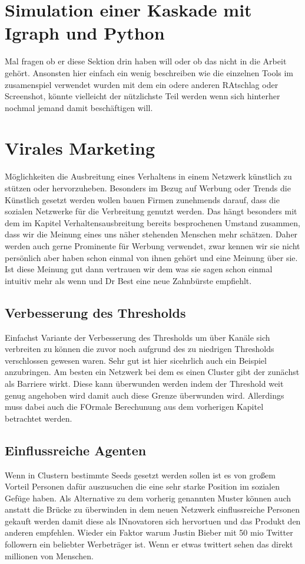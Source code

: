 \documentclass[12pt]{article}
\begin{document}
\section{Simulation einer Kaskade mit Igraph und Python}
Mal fragen ob er diese Sektion drin haben will oder ob das nicht in die Arbeit gehört. Ansonsten hier einfach ein wenig beschreiben wie die einzelnen Tools im zusamenspiel verwendet wurden mit dem ein odere anderen RAtschlag oder Screenshot, könnte vielleicht der nützlichste Teil werden wenn sich hinterher nochmal jemand damit beschäftigen will.

\section{Virales Marketing}
Möglichkeiten die Ausbreitung eines Verhaltens in einem Netzwerk künstlich zu stützen oder hervorzuheben. Besonders im Bezug auf Werbung oder Trends die Künstlich gesetzt werden wollen bauen Firmen zunehmends darauf, dass die sozialen Netzwerke für die Verbreitung genutzt werden. Das hängt besonders mit dem im Kapitel Verhaltensausbreitung bereits besprochenen Umstand zusammen, dass wir die Meinung eines uns näher stehenden Menschen mehr schätzen. Daher werden auch gerne Prominente für Werbung verwendet, zwar kennen wir sie nicht persönlich aber haben schon einmal von ihnen gehört und eine Meinung über sie. Ist diese Meinung gut dann vertrauen wir dem was sie sagen schon einmal intuitiv mehr als wenn und Dr Best eine neue Zahnbürste empfiehlt.
\subsection{Verbesserung des Thresholds}
Einfachst Variante der Verbesserung des Thresholds um über Kanäle sich verbreiten zu können die zuvor noch aufgrund des zu niedrigen Thresholds verschlossen gewesen waren. Sehr gut ist hier sicehrlich auch ein Beispiel anzubringen. Am besten ein Netzwerk bei dem es einen Cluster gibt der zunächst als Barriere wirkt. Diese kann überwunden werden indem der Threshold weit genug angehoben wird damit auch diese Grenze überwunden wird. Allerdings muss dabei auch die FOrmale Berechunung aus dem vorherigen Kapitel betrachtet werden.
\subsection{Einflussreiche Agenten}
Wenn in Clustern bestimmte Seeds gesetzt werden sollen ist es von großem Vorteil Personen dafür auszusuchen die eine sehr starke Position im sozialen Gefüge haben. Als Alternative zu dem vorherig genannten Muster können auch anstatt die Brücke zu überwinden in dem neuen Netzwerk einflussreiche Personen gekauft werden damit diese als INnovatoren sich hervortuen und das Produkt den anderen empfehlen. Wieder ein Faktor warum Justin Bieber mit 50 mio Twitter followern ein beliebter Werbeträger ist. Wenn er etwas twittert sehen das direkt millionen von Menschen. 
\end{document}
